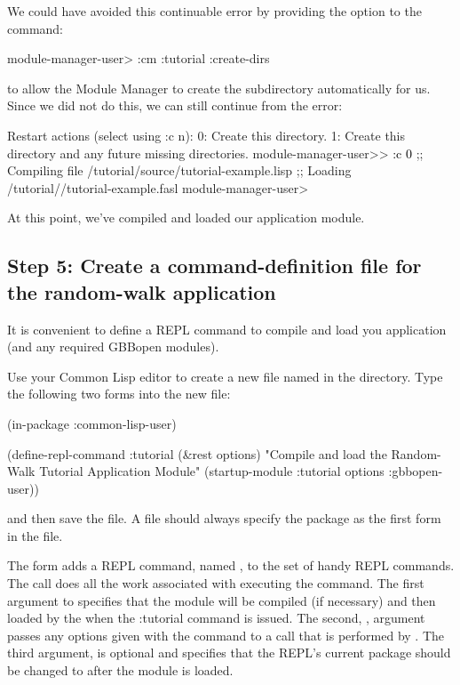 \documentclass[10pt,twoside,english,pdftex]{article}
\begin{document}
We could have avoided this continuable error by providing the
 option to the  command:
%
\W\supp
\begin{example}
\textcolor{darkergray}{%
  module-manager-user> :cm :tutorial :create-dirs}
\end{example}
%
to allow the Module Manager to create the 
subdirectory automatically for us.  Since we did not do this, we can still
continue from the error:
%
\W\supp\notpretop
\begin{smallexample}
\textcolor{darkergray}{%
  Restart actions (select using :c n):
    0: Create this directory.
    1: Create this directory and any future missing directories.
  module-manager-user>> \textcolor{black}{:c 0}
  ;; Compiling file /tutorial/source/tutorial-example.lisp
  ;; Loading /tutorial//tutorial-example.fasl
  module-manager-user>}
\end{smallexample}

At this point, we've compiled and loaded our  application
module.

\subsection*{Step 5: Create a command-definition file for the random-walk
  application}

It is convenient to define a REPL command to compile and load you application
(and any required GBBopen modules).  

Use your Common Lisp editor to create a new file named
 in the  directory. Type the
following two forms into the new  file:
%
%
%
\W\supp
\begin{example}
  (in-package :common-lisp-user)

  (define-repl-command :tutorial (\&rest options)
    "Compile and load the Random-Walk Tutorial Application Module"
    (startup-module :tutorial options :gbbopen-user))
\end{example}
%
and then save the file.  A  file should always
specify the  package as the first form in the
file.

The  form adds a REPL command, named
, to the set of handy REPL commands.  The
 call does all the work associated with
executing the command.  The first argument to 
specifies that the  module will be compiled (if necessary) and
then loaded by the  when the
\code:{tutorial} command is issued.  The second, , argument
passes any options given with the command to a 
call that is performed by .  The third argument,
 is optional and specifies that the REPL's current
package should be changed to  after the
 module is loaded.
\end{document}
